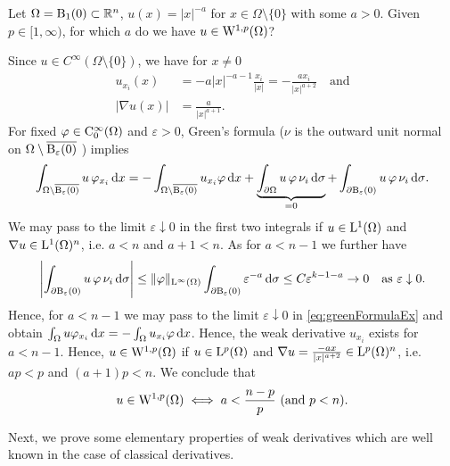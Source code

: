 \begin{ex}
  Let $\Omega = \mathrm{B}_1(0) \subset \mathbb{R}^n$, $u(x) = |x|^{-a}$ for $x \in \Omega \setminus \{0\}$ with some $a > 0$.
  Given $p \in [1,\infty)$, for which $a$ do we have $u \in \mathrm{W}^{1,p}(\Omega)$?

    Since $u \in C^\infty(\Omega \setminus \{0\})$, we have for $x \neq 0$
    \begin{align*}
      u_{x_i}(x) &= -a|x|^{-a-1} \frac{x_i}{|x|} = -\frac{ax_i}{|x|^{a + 2}} \quad \text{and} \\
      |\nabla u(x)| &= \frac{a}{|x|^{a + 1}}.
    \end{align*}
    For fixed $\varphi \in \mathrm{C}_0^\infty(\Omega)$ and $\varepsilon > 0$, Green's formula ($\nu$ is the outward unit normal on $\Omega \setminus \overline{\mathrm{B}_\varepsilon(0)}$ ) implies
    \begin{equation}
      \label{eq:greenFormulaEx}
      \int_{\Omega \setminus \overline{\mathrm{B}_\varepsilon(0)}} u \, \varphi_{x_i} \, {\operatorname{d}\!{x}}
      = -\int_{\Omega \setminus \overline{\mathrm{B}_\varepsilon(0)}} u_{x_i} \varphi \, {\operatorname{d}\!{x}} + \underbrace{\int_{\partial \Omega} u \, \varphi \, \nu_i \, {\operatorname{d}\!{\sigma}}}_{= 0}
      + \int_{\partial \mathrm{B}_\varepsilon(0)} u \, \varphi \, \nu_i \, {\operatorname{d}\!{\sigma}}.
    \end{equation}
    We may pass to the limit $\varepsilon \downarrow 0$ in the first two integrals if $u \in \mathrm{L}^1(\Omega)$ and $\nabla u \in \mathrm{L}^1(\Omega)^n$, i.e. $a < n$ and $a + 1 < n$.
    As for $a < n - 1$ we further have
    $$
    \left| \int_{\partial \mathrm{B}_\varepsilon(0)} u \, \varphi \,  \nu_i \, {\operatorname{d}\!{\sigma}} \right|
      \leq \|\varphi\|_{\mathrm{L}^\infty(\Omega)} \int_{\partial \mathrm{B}_\varepsilon(0)} \varepsilon^{-a} \, {\operatorname{d}\!{\sigma}}
      \leq C \varepsilon^{k - 1 - a} \to 0 \quad\text{as } \varepsilon \downarrow 0.
    $$
    Hence, for $a < n - 1$ we may pass to the limit $\varepsilon \downarrow 0$ in \eqref{eq:greenFormulaEx} and obtain $\int_\Omega u\varphi_{x_i} \, {\operatorname{d}\!{x}} = - \int_\Omega u_{x_i} \varphi \, {\operatorname{d}\!{x}}$.
    Hence, the weak derivative $u_{x_i}$ exists for $a < n - 1$.
    Hence, $u \in \mathrm{W}^{1,p}(\Omega)$ if $u \in \mathrm{L}^p(\Omega)$ and $\nabla u = \frac{-a x}{|x|^{a + 2}} \in \mathrm{L}^p(\Omega)^n$, i.e. $ap < p$ and $(a + 1)p < n$.
    We conclude that
    $$
    u \in \mathrm{W}^{1,p}(\Omega) \iff a < \frac{n - p}{p} \text{ (and $p < n$)}.
    $$
\end{ex}

Next, we prove some elementary properties of weak derivatives which are well known in the case of classical derivatives.

